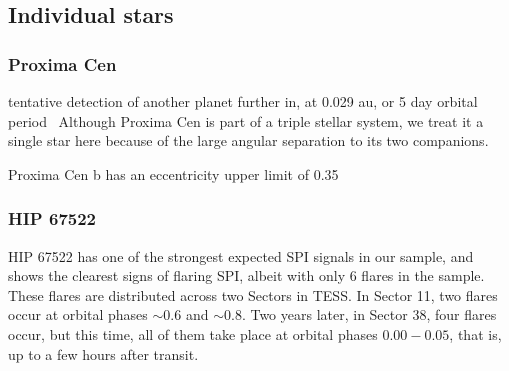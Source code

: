 \documentclass[twocolumn]{aastex631}
\begin{document}



\subsection{Individual stars}

\subsubsection{Proxima Cen}
tentative detection of another planet further in, at 0.029 au, or 5 day orbital period~\citep{faria2022candidate, artigau2022linebyline}
Although Proxima Cen is part of a triple stellar system, we treat it a single star here because of the large angular separation to its two companions.

Proxima Cen b has an eccentricity upper limit of 0.35~\cite{anglada-escude2016terrestrial}

\subsubsection{HIP 67522}
HIP 67522 has one of the strongest expected SPI signals in our sample, and shows the clearest signs of flaring SPI, albeit with only 6 flares in the sample. These flares are distributed across two Sectors in TESS. In Sector 11, two flares occur at orbital phases $\sim 0.6$ and $\sim 0.8$. Two years later, in Sector 38, four flares occur, but this time, all of them take place at orbital phases $0.00-0.05$, that is, up to a few hours after transit.
\end{document}
